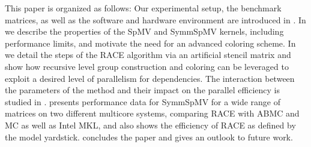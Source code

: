 This paper is organized as follows: Our experimental setup, the benchmark
matrices, as well as the software and hardware environment are introduced
in . In  we describe the properties
of the \acrshort{SpMV} and \acrshort{SymmSpMV} kernels, including
\roofline performance limits, and motivate the need for an advanced coloring scheme.
In  we detail the steps of the \acrshort{RACE} algorithm
via an artificial stencil matrix and show how recursive level group construction
and coloring can be leveraged to exploit a desired level of parallelism
for \DK dependencies. The interaction between the parameters of the method
and their impact on the parallel efficiency is studied in .
 presents performance data for \acrshort{SymmSpMV}
for a wide range of matrices on two different multicore systems,
comparing \acrshort{RACE} with \acrshort{ABMC} and \acrshort{MC} as well as
Intel MKL, and also shows the efficiency of \acrshort{RACE} as
defined by the \roofline model yardstick.
 concludes the paper and gives an outlook to
future work. 





